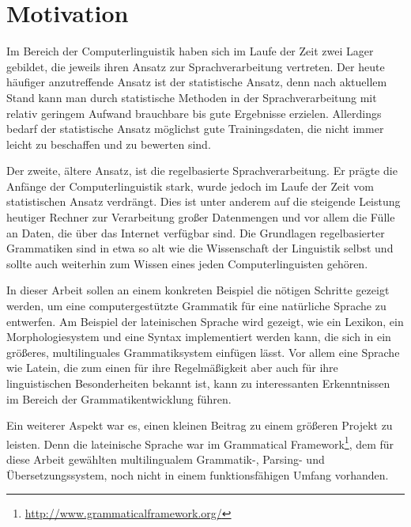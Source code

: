 \documentclass[fontsize=12pt,abstract=on,titlepage,bibliography=totoc,ngerman,listof=totoc]{scrreprt}
\begin{document}
\section{Motivation}
\label{sec:motivation}
Im Bereich der Computerlinguistik haben sich im Laufe der Zeit zwei Lager gebildet, die jeweils ihren Ansatz zur Sprachverarbeitung vertreten. Der heute häufiger anzutreffende Ansatz ist der statistische Ansatz, denn nach aktuellem Stand kann man durch statistische Methoden in der Sprachverarbeitung mit relativ geringem Aufwand brauchbare bis gute Ergebnisse erzielen. Allerdings bedarf der statistische Ansatz möglichst gute Trainingsdaten, die nicht immer leicht zu beschaffen und zu bewerten sind. \par
Der zweite, ältere Ansatz, ist die regelbasierte Sprachverarbeitung. Er prägte die Anfänge der Computerlinguistik stark, wurde jedoch im Laufe der Zeit vom statistischen Ansatz verdrängt. Dies ist unter anderem auf die steigende Leistung heutiger Rechner zur Verarbeitung großer Datenmengen und vor allem die Fülle an Daten, die über das Internet verfügbar sind. Die Grundlagen regelbasierter Grammatiken sind in etwa so alt wie die Wissenschaft der Linguistik selbst und sollte auch weiterhin zum Wissen eines jeden Computerlinguisten gehören. \par
In dieser Arbeit sollen an einem konkreten Beispiel die nötigen Schritte gezeigt werden, um eine computergestützte Grammatik für eine natürliche Sprache zu entwerfen. Am Beispiel der lateinischen Sprache wird gezeigt, wie ein Lexikon, ein Morphologiesystem und eine Syntax implementiert werden kann, die sich in ein größeres, multilinguales Grammatiksystem einfügen lässt. Vor allem eine Sprache wie Latein, die zum einen für ihre Regelmäßigkeit aber auch für ihre linguistischen Besonderheiten bekannt ist, kann zu interessanten Erkenntnissen im Bereich der Grammatikentwicklung führen. \par
Ein weiterer Aspekt war es, einen kleinen Beitrag zu einem größeren Projekt zu leisten. Denn die lateinische Sprache war im Grammatical Framework\footnote{\url{http://www.grammaticalframework.org/}}, dem für diese Arbeit gewählten multilingualem Grammatik-, Parsing- und Übersetzungssystem, noch nicht in einem funktionsfähigen Umfang vorhanden.
\pagebreak
\end{document}
